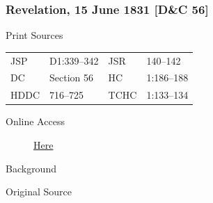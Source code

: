 		\subsubsection{Revelation, 15 June 1831 [D\&C 56]}
			\label{EMS-1831-JS-15-JUN-1831}
		
			\begin{description}
				\item[Print Sources]
			\end{description}

				\begin{tabular}{p{0.5in}p{1in}p{0.5in}p{1in}}
				JSP	 	& D1:339--342	& JSR 		& 140--142 \\
				DC	 	& Section 56 	& HC 		& 1:186--188 \\
				HDDC 	& 716--725		& TCHC 		& 1:133--134 \\
				\end{tabular}
			
			\begin{description}
				\item[Online Access] \href{https://www.josephsmithpapers.org/paper-summary/revelation-15-june-1831-dc-56/1}{Here}
			\end{description}
			
			\begin{description}
				\item[Background]
			\end{description}
			
			
			\begin{description}
				\item[Original Source]
			\end{description}
			
			
